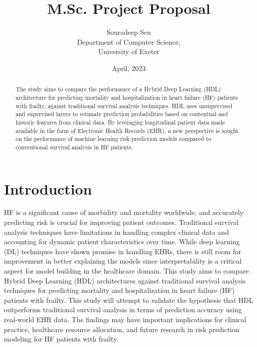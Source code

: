 \documentclass[%
 reprint,
 amsmath,amssymb,
 aps,
 nofootinbib,
]{revtex4-2}
\theoremstyle{definition}
\begin{document}

\title{M.Sc. Project Proposal}%
\author{Souradeep Sen \\
	 \small Department of Computer Science, \\ 
	 \small University of Exeter
	}

\date{April, 2023}%

\begin{abstract}
The study aims to compare the performance of a Hybrid Deep Learning (HDL) architecture for predicting mortality and hospitalization in heart failure (HF) patients with frailty, against traditional survival analysis techniques. HDL uses unsupervised and supervised layers to estimate prediction probabilities based on contextual and historic features from clinical data. By leveraging longitudinal patient data made available in the form of Electronic Health Records (EHR), a new perspective is sought on the performance of machine learning risk prediction models compared to conventional survival analysis in HF patients.
\end{abstract}

\maketitle

\section{\label{intro}Introduction}
HF is a significant cause of morbidity and mortality worldwide, and accurately predicting risk is crucial for improving patient outcomes. Traditional survival analysis techniques have limitations in handling complex clinical data and accounting for dynamic patient characteristics over time. While deep learning (DL) techniques have shown promise in handling EHRs, there is still room for improvement in better explaining the models since interpretability is a critical aspect for model building in the healthcare domain. This study aims to compare Hybrid Deep Learning (HDL) architectures against traditional survival analysis techniques for predicting mortality and hospitalization in heart failure (HF) patients with frailty. This study will attempt to validate the hypothesis that HDL outperforms traditional survival analysis in terms of prediction accuracy using real-world EHR data. The findings may have important implications for clinical practice, healthcare resource allocation, and future research in risk prediction modeling for HF patients with frailty.
\end{document}
